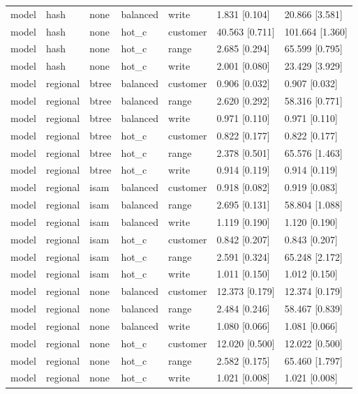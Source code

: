 \begin{table}[htbp]
{\begin{tabular}{lllllll}
model & hash & none & balanced & write & 1.831 [0.104] & 20.866 [3.581] \\
model & hash & none & hot\_c & customer & 40.563 [0.711] & 101.664 [1.360] \\
model & hash & none & hot\_c & range & 2.685 [0.294] & 65.599 [0.795] \\
model & hash & none & hot\_c & write & 2.001 [0.080] & 23.429 [3.929] \\
model & regional & btree & balanced & customer & 0.906 [0.032] & 0.907 [0.032] \\
model & regional & btree & balanced & range & 2.620 [0.292] & 58.316 [0.771] \\
model & regional & btree & balanced & write & 0.971 [0.110] & 0.971 [0.110] \\
model & regional & btree & hot\_c & customer & 0.822 [0.177] & 0.822 [0.177] \\
model & regional & btree & hot\_c & range & 2.378 [0.501] & 65.576 [1.463] \\
model & regional & btree & hot\_c & write & 0.914 [0.119] & 0.914 [0.119] \\
model & regional & isam & balanced & customer & 0.918 [0.082] & 0.919 [0.083] \\
model & regional & isam & balanced & range & 2.695 [0.131] & 58.804 [1.088] \\
model & regional & isam & balanced & write & 1.119 [0.190] & 1.120 [0.190] \\
model & regional & isam & hot\_c & customer & 0.842 [0.207] & 0.843 [0.207] \\
model & regional & isam & hot\_c & range & 2.591 [0.324] & 65.248 [2.172] \\
model & regional & isam & hot\_c & write & 1.011 [0.150] & 1.012 [0.150] \\
model & regional & none & balanced & customer & 12.373 [0.179] & 12.374 [0.179] \\
model & regional & none & balanced & range & 2.484 [0.246] & 58.467 [0.839] \\
model & regional & none & balanced & write & 1.080 [0.066] & 1.081 [0.066] \\
model & regional & none & hot\_c & customer & 12.020 [0.500] & 12.022 [0.500] \\
model & regional & none & hot\_c & range & 2.582 [0.175] & 65.460 [1.797] \\
model & regional & none & hot\_c & write & 1.021 [0.008] & 1.021 [0.008] \\
\bottomrule
\end{tabular}}
\end{table}

